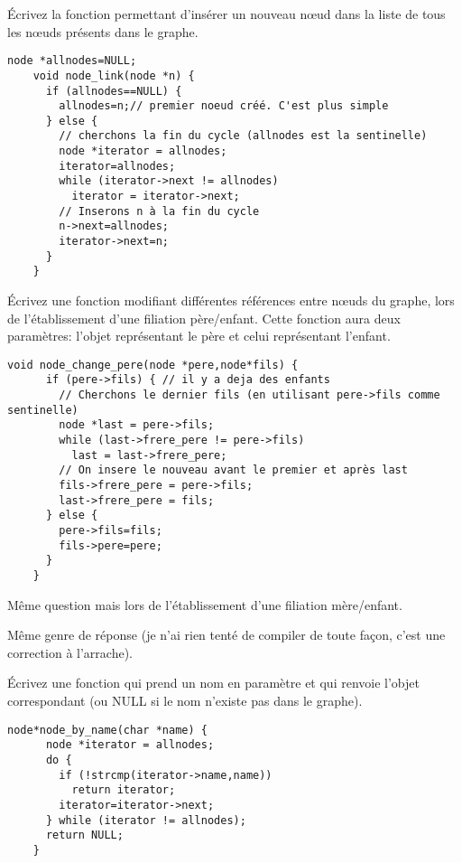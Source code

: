 \documentclass[10pt]{article}\usepackage[nu]{esial}
\begin{document}
\Question Écrivez la fonction permettant d'insérer un nouveau nœud dans la
liste de tous les nœuds présents dans le graphe.

\begin{Reponse}
  \begin{Verbatim}[gobble=4]
    node *allnodes=NULL;
    void node_link(node *n) {
      if (allnodes==NULL) {
        allnodes=n;// premier noeud créé. C'est plus simple
      } else {
        // cherchons la fin du cycle (allnodes est la sentinelle)
        node *iterator = allnodes;
        iterator=allnodes;
        while (iterator->next != allnodes)
          iterator = iterator->next;
        // Inserons n à la fin du cycle
        n->next=allnodes;
        iterator->next=n;
      }
    }
  \end{Verbatim}
\end{Reponse}


\Question Écrivez une fonction modifiant différentes références entre nœuds du
graphe, lors de l'établissement d'une filiation père/enfant. Cette fonction
aura deux paramètres: l'objet représentant le père et celui représentant
l'enfant.
\begin{Reponse}
  \begin{Verbatim}[gobble=4]
    void node_change_pere(node *pere,node*fils) {
      if (pere->fils) { // il y a deja des enfants
        // Cherchons le dernier fils (en utilisant pere->fils comme sentinelle)
        node *last = pere->fils;
        while (last->frere_pere != pere->fils)
          last = last->frere_pere;
        // On insere le nouveau avant le premier et après last
        fils->frere_pere = pere->fils;
        last->frere_pere = fils;
      } else {
        pere->fils=fils;
        fils->pere=pere;
      }
    }
  \end{Verbatim}
\end{Reponse}


\Question Même question mais lors de l'établissement d'une filiation
mère/enfant.

\begin{Reponse}
  Même genre de réponse (je n'ai rien tenté de compiler de toute façon, c'est
  une correction à l'arrache).
\end{Reponse}

\Question Écrivez une fonction qui prend un nom en paramètre et qui renvoie
l'objet correspondant (ou NULL si le nom n'existe pas dans le graphe).

\begin{Reponse}
  \begin{Verbatim}[gobble=4]
    node*node_by_name(char *name) {
      node *iterator = allnodes;
      do {
        if (!strcmp(iterator->name,name))
          return iterator;
        iterator=iterator->next;
      } while (iterator != allnodes);
      return NULL;
    }
  \end{Verbatim}
\end{Reponse}
\end{document}
